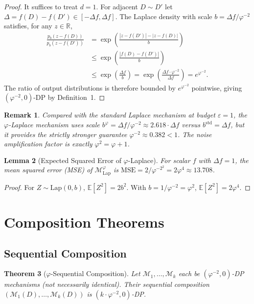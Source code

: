 \documentclass[12pt]{article}
\newtheorem{theorem}{Theorem}
\newtheorem{lemma}[theorem]{Lemma}
\newtheorem{remark}[theorem]{Remark}
\newcommand{\AMOR}{\varphi^{-2}}
\newcommand{\PHI}{\varphi}
\newcommand{\Lap}{\mathrm{Lap}}
\newcommand{\eps}{\varepsilon}
\newcommand{\Mech}{\mathcal{M}}
\newcommand{\E}{\mathbb{E}}
\newcommand{\R}{\mathbb{R}}
\newcommand{\Sens}{\Delta}
\begin{document}
\begin{proof}
It suffices to treat $d=1$.  For adjacent $D \sim D'$ let $\Delta = f(D) -
f(D') \in [-\Sens f, \Sens f]$.  The Laplace density with scale $b =
\Sens f / \AMOR$ satisfies, for any $z \in \R$,
\begin{align*}
  \frac{p_b(z - f(D))}{p_b(z - f(D'))}
  &= \exp\!\left(\frac{|z - f(D')| - |z - f(D)|}{b}\right) \\
  &\le \exp\!\left(\frac{|f(D) - f(D')|}{b}\right) \\
  &\le \exp\!\left(\frac{\Sens f}{b}\right)
   = \exp\!\left(\frac{\Sens f \cdot \AMOR}{\Sens f}\right)
   = e^{\AMOR}.
\end{align*}
The ratio of output distributions is therefore bounded by $e^{\AMOR}$ pointwise,
giving $(\AMOR, 0)$-DP by Definition~1.
\end{proof}

\begin{remark}
Compared with the standard Laplace mechanism at budget $\eps = 1$, the
$\varphi$-Laplace mechanism uses scale $b^\PHI = \Sens f / \AMOR \approx 2.618
\cdot \Sens f$ versus $b^{\mathrm{std}} = \Sens f$, but it provides the
strictly stronger guarantee $\AMOR \approx 0.382 < 1$.  The noise amplification
factor is exactly $\PHI^2 = \PHI + 1$.
\end{remark}

\begin{lemma}[Expected Squared Error of $\varphi$-Laplace]
\label{lem:mse}
For scalar $f$ with $\Sens f = 1$, the mean squared error (MSE) of
$\Mech_\Lap^\PHI$ is $\mathrm{MSE} = 2/\AMOR^2 = 2\PHI^4 \approx 13.708$.
\end{lemma}

\begin{proof}
For $Z \sim \Lap(0, b)$, $\E[Z^2] = 2b^2$.  With $b = 1/\AMOR = \PHI^2$,
$\E[Z^2] = 2\PHI^4$.
\end{proof}

\section{Composition Theorems}
\label{sec:composition}

\subsection{Sequential Composition}

\begin{theorem}[$\varphi$-Sequential Composition]
\label{thm:seq-comp}
Let $\Mech_1, \ldots, \Mech_k$ each be $(\AMOR, 0)$-DP mechanisms (not
necessarily identical).  Their sequential composition
$(\Mech_1(D), \ldots, \Mech_k(D))$ is $(k \cdot \AMOR, 0)$-DP.
\end{theorem}
\end{document}
